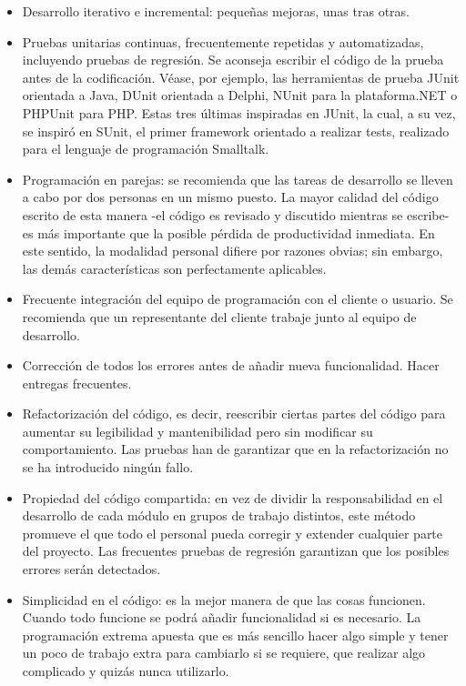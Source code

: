 \begin{itemize}
	\itemsep1pt \parskip1pt 
	\item Desarrollo iterativo e incremental: pequeñas mejoras, unas tras otras.
	\item Pruebas unitarias continuas, frecuentemente repetidas y automatizadas, incluyendo pruebas de regresión. Se aconseja escribir el código de la prueba antes de la codificación. Véase, por ejemplo, las herramientas de prueba JUnit orientada a Java, DUnit orientada a Delphi, NUnit para la plataforma.NET o PHPUnit para PHP. Estas tres últimas inspiradas en JUnit, la cual, a su vez, se inspiró en SUnit, el primer framework orientado a realizar tests, realizado para el lenguaje de programación Smalltalk.
	\item Programación en parejas: se recomienda que las tareas de desarrollo se lleven a cabo por dos personas en un mismo puesto. La mayor calidad del código escrito de esta manera -el código es revisado y discutido mientras se escribe- es más importante que la posible pérdida de productividad inmediata. En este sentido, la modalidad personal difiere por razones obvias; sin embargo, las demás características son perfectamente aplicables.
	\item Frecuente integración del equipo de programación con el cliente o usuario. Se recomienda que un representante del cliente trabaje junto al equipo de desarrollo.
	\item Corrección de todos los errores antes de añadir nueva funcionalidad. Hacer entregas frecuentes.
	\item Refactorización del código, es decir, reescribir ciertas partes del código para aumentar su legibilidad y mantenibilidad pero sin modificar su comportamiento. Las pruebas han de garantizar que en la refactorización no se ha introducido ningún fallo.
	\item Propiedad del código compartida: en vez de dividir la responsabilidad en el desarrollo de cada módulo en grupos de trabajo distintos, este método promueve el que todo el personal pueda corregir y extender cualquier parte del proyecto. Las frecuentes pruebas de regresión garantizan que los posibles errores serán detectados.
	\item Simplicidad en el código: es la mejor manera de que las cosas funcionen. Cuando todo funcione se podrá añadir funcionalidad si es necesario. La programación extrema apuesta que es más sencillo hacer algo simple y tener un poco de trabajo extra para cambiarlo si se requiere, que realizar algo complicado y quizás nunca utilizarlo.
\end{itemize}

